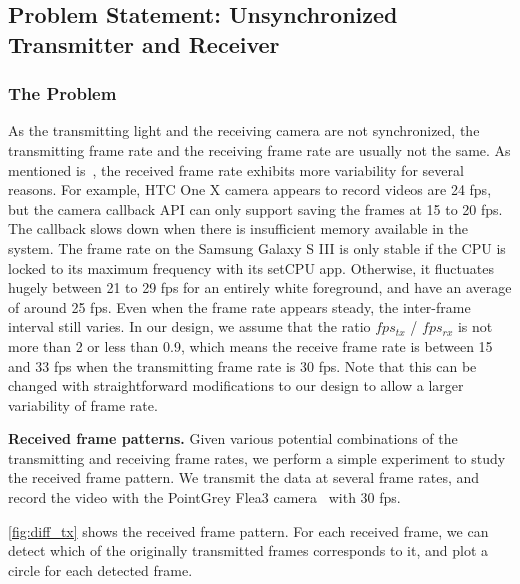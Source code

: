 \subsection{Problem Statement: Unsynchronized Transmitter and Receiver}

\subsubsection{The Problem}

As the transmitting light and the receiving camera are not synchronized, the transmitting frame rate and the receiving frame rate are usually not the same. 
As mentioned is~\cite{hu2013lightsync}, the received frame rate exhibits more variability for several reasons. For example, HTC One X camera appears to record videos are 24 fps, but the camera callback API can only support saving the frames at 15 to 20 fps. The callback slows down when there is insufficient memory available in the system. The frame rate on the Samsung Galaxy S III is only stable if the CPU is locked to its maximum frequency with its setCPU app. Otherwise, it fluctuates hugely between 21 to 29 fps for an entirely white foreground, and have an average of around 25 fps. Even when the frame rate appears steady, the inter-frame interval still varies.
In our design, we assume that the ratio $fps_{tx}$ / $fps_{rx}$ is not more than 2 or less than 0.9, which means the receive frame rate is between 15 and 33 fps when the transmitting frame rate is 30 fps. Note that this can be changed with straightforward modifications to our design to allow a larger variability of frame rate.

\textbf{Received frame patterns.} Given various potential combinations of the transmitting and receiving frame rates, we perform a simple experiment to study the received frame pattern. We transmit the data at several frame rates, and record the video with the PointGrey Flea3 camera~\cite{pointgrey_flea} with 30 fps.

\autoref{fig:diff_tx} shows the received frame pattern. For each received frame, we can detect which of the originally transmitted frames corresponds to it, and plot a circle for each detected frame. 

